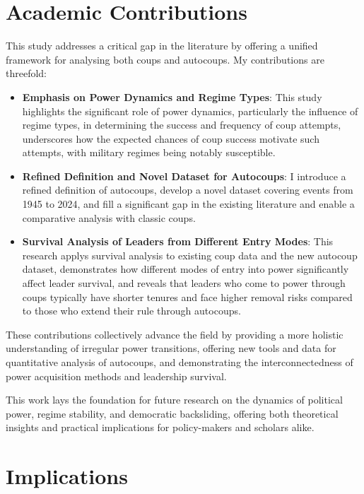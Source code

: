 \documentclass[
  12pt,
]{report}
\providecommand{\tightlist}{%
  \setlength{\itemsep}{0pt}\setlength{\parskip}{0pt}}\usepackage{longtable,booktabs,array}
\begin{document}
\section{Academic Contributions}\label{academic-contributions}

This study addresses a critical gap in the literature by offering a
unified framework for analysing both coups and autocoups. My
contributions are threefold:

\begin{itemize}
\tightlist
\item
  \textbf{Emphasis on Power Dynamics and Regime Types}: This study
  highlights the significant role of power dynamics, particularly the
  influence of regime types, in determining the success and frequency of
  coup attempts, underscores how the expected chances of coup success
  motivate such attempts, with military regimes being notably
  susceptible.
\item
  \textbf{Refined Definition and Novel Dataset for Autocoups}: I
  introduce a refined definition of autocoups, develop a novel dataset
  covering events from 1945 to 2024, and fill a significant gap in the
  existing literature and enable a comparative analysis with classic
  coups.
\item
  \textbf{Survival Analysis of Leaders from Different Entry Modes}: This
  research applys survival analysis to existing coup data and the new
  autocoup dataset, demonstrates how different modes of entry into power
  significantly affect leader survival, and reveals that leaders who
  come to power through coups typically have shorter tenures and face
  higher removal risks compared to those who extend their rule through
  autocoups.
\end{itemize}

These contributions collectively advance the field by providing a more
holistic understanding of irregular power transitions, offering new
tools and data for quantitative analysis of autocoups, and demonstrating
the interconnectedness of power acquisition methods and leadership
survival.

This work lays the foundation for future research on the dynamics of
political power, regime stability, and democratic backsliding, offering
both theoretical insights and practical implications for policy-makers
and scholars alike.

\section{Implications}\label{implications}
\end{document}
